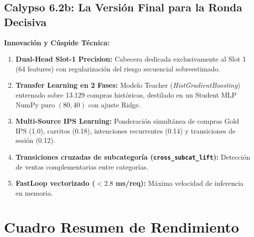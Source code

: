 \documentclass[11pt,a4paper]{article}
\begin{document}
\subsection{Calypso 6.2b: La Versión Final para la Ronda Decisiva}
\textbf{Innovación y Cúspide Técnica:}
\begin{enumerate}[noitemsep]
    \item \textbf{Dual-Head Slot-1 Precision:} Cabecera dedicada exclusivamente al Slot 1 (64 features) con regularización del riesgo secuencial sobreestimado.
    \item \textbf{Transfer Learning en 2 Fases:} Modelo Teacher (\textit{HistGradientBoosting}) entrenado sobre 13.129 compras históricas, destilado en un Student MLP NumPy puro $(80, 40)$ con ajuste Ridge.
    \item \textbf{Multi-Source IPS Learning:} Ponderación simultánea de compras Gold IPS (1.0), carritos (0.18), intenciones recurrentes (0.14) y transiciones de sesión (0.12).
    \item \textbf{Transiciones cruzadas de subcategoría (\texttt{cross\_subcat\_lift}):} Detección de ventas complementarias entre categorías.
    \item \textbf{FastLoop vectorizado ($< 2.8$ ms/req):} Máxima velocidad de inferencia en memoria.
\end{enumerate}

\section{Cuadro Resumen de Rendimiento}
\end{document}
